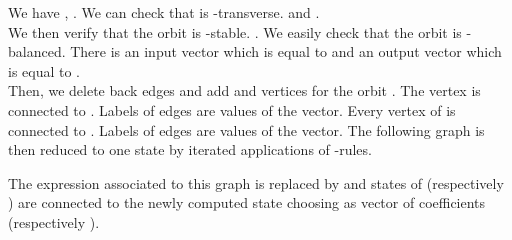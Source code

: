 \documentclass[11pt]{article}
\begin{document}
\medskip



We have ,
. We can check that  is -transverse.  and .\\ 

We then verify that the orbit  is -stable.
.
 We easily check that the orbit is -balanced. There is an input vector  which is equal to  and an output vector  which is equal to .\\
 
Then, we delete back edges and add  and  vertices for the orbit . The  vertex is connected to . Labels of edges are values of the   vector.
Every vertex of  is connected to . Labels of edges are values of the  vector. The following graph is then reduced to one state by iterated applications of -rules. 



 The expression  associated to this graph is replaced by  and states of  (respectively ) are connected to the newly computed state choosing  as vector of coefficients (respectively ).


\medskip
\end{document}
